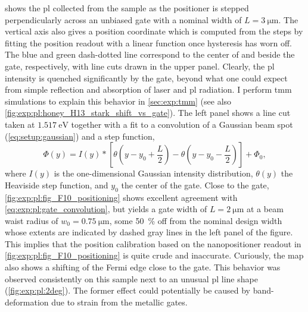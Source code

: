  shows the \gls{pl} collected from the sample as the positioner is stepped perpendicularly across an unbiased gate with a nominal width of $L = \qty{3}{\micro\meter}$.
The vertical axis also gives a position coordinate which is computed from the steps by fitting the position readout with a linear function once hysteresis has worn off.
The blue and green dash-dotted line correspond to the center of and beside the gate, respectively, with line cuts drawn in the upper panel.
Clearly, the \gls{pl} intensity is quenched significantly by the gate, beyond what one could expect from simple reflection and absorption of laser and \gls{pl} radiation.
I perform \gls{tmm} simulations to explain this behavior in \cref{sec:exp:tmm} (see also \cref{fig:exp:pl:honey_H13_stark_shift_vs_gate}).
The left panel shows a line cut taken at $\qty{1.517}{\electronvolt}$ together with a fit to a convolution of a Gaussian beam spot (\cref{eq:setup:gaussian}) and a step function,
\begin{equation}\label{eq:exp:pl:gate_convolution}
    \Phi(y) = I(y)\ast\left[\theta\left(y - y_0 + \frac{L}{2}\right) - \theta\left(y - y_0 - \frac{L}{2}\right)\right] + \Phi_0,
\end{equation}
where $I(y)$ is the one-dimensional Gaussian intensity distribution, $\theta(y)$ the Heaviside step function, and $y_0$ the center of the gate.
Close to the gate, \cref{fig:exp:pl:fig_F10_positioning} shows excellent agreement with \cref{eq:exp:pl:gate_convolution}, but yields a gate width of $L=\qty{2}{\micro\meter}$ at a beam waist radius of $w_0=\qty{0.75}{\micro\meter}$, some \qty{50}{\percent} off from the nominal design width whose extents are indicated by dashed gray lines in the left panel of the figure.
This implies that the position calibration based on the nanopositioner readout in \cref{fig:exp:pl:fig_F10_positioning} is quite crude and inaccurate.
Curiously, the map also shows a shifting of the Fermi edge close to the gate.
This behavior was observed consistently on this sample next to an unusual \gls{pl} line shape (\cf \cref{fig:exp:pl:2deg}).
The former effect could potentially be caused by band-deformation due to strain from the metallic gates.

